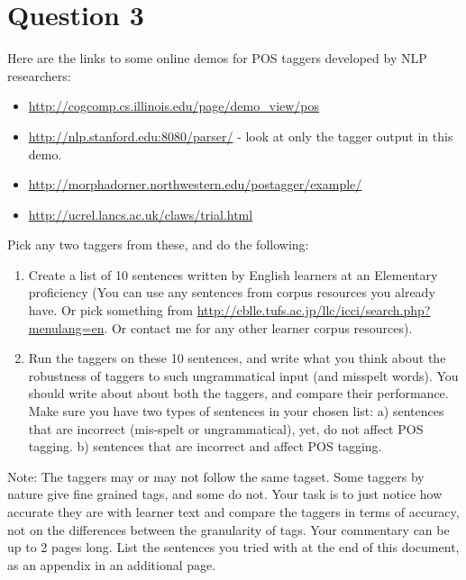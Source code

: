 \documentclass[11pt,a4paper]{article}
\begin{document}
\section*{Question 3} 
Here are the links to some online demos for POS taggers developed by NLP researchers:
\begin{itemize}
\item \url{http://cogcomp.cs.illinois.edu/page/demo\_view/pos}
\item \url{http://nlp.stanford.edu:8080/parser/} - look at only the tagger output in this demo.
\item \url{http://morphadorner.northwestern.edu/postagger/example/}
\item \url{http://ucrel.lancs.ac.uk/claws/trial.html}
\end{itemize}
Pick any two taggers from these, and do the following:
\begin{enumerate}
\item Create a list of 10 sentences written by English learners at an Elementary proficiency (You can use any sentences from corpus resources you already have. Or pick something from \url{http://cblle.tufs.ac.jp/llc/icci/search.php?menulang=en}. Or contact me for any other learner corpus resources). 
\item Run the taggers on these 10 sentences, and write what you think about the robustness of taggers to such ungrammatical input (and misspelt words). You should write about about both the taggers, and compare their performance. Make sure you have two types of sentences in your chosen list: a) sentences that are incorrect (mis-spelt or ungrammatical), yet, do not affect POS tagging. b) sentences that are incorrect and affect POS tagging.
\end{enumerate}
Note: The taggers may or may not follow the same tagset. Some taggers by nature give fine grained tags, and some do not. Your task is to just notice how accurate they are with learner text and compare the taggers in terms of accuracy, not on the differences between the granularity of tags. Your commentary can be up to 2 pages long. List the sentences you tried with at the end of this document, as an appendix in an additional page. 
\end{document}
